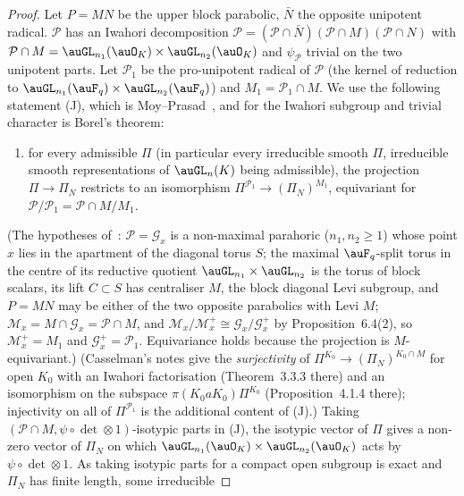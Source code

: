 \documentclass[10pt]{amsart}
\theoremstyle{definition}
\theoremstyle{remark}
\begin{document}
\begin{proof}
Let $P=MN$ be the upper block parabolic, $\bar N$ the opposite unipotent radical. $\mathcal P$ has
an Iwahori decomposition $\mathcal P=(\mathcal P\cap\bar N)(\mathcal P\cap M)(\mathcal P\cap N)$
with $\mathcal P\cap M=\auGL_{n_1}(\auO_K)\times\auGL_{n_2}(\auO_K)$ and $\psi_{\mathcal P}$ trivial on
the two unipotent parts. Let $\mathcal P_1$ be the pro-unipotent radical of $\mathcal P$ (the
kernel of reduction to $\auGL_{n_1}(\auF_q)\times\auGL_{n_2}(\auF_q)$) and $M_1=\mathcal P_1\cap M$.
We use the following statement (J), which is Moy--Prasad~\cite[Proposition~6.7, p.~116]{MoyPrasad}, and for
the Iwahori subgroup and trivial character is Borel's theorem:
\begin{enumerate}
\item[(J)] for every admissible $\Pi$ (in particular every irreducible smooth $\Pi$, irreducible smooth
representations of $\auGL_n(K)$ being admissible), the projection $\Pi\to\Pi_N$ restricts to an isomorphism
$\Pi^{\mathcal P_1}\to(\Pi_N)^{M_1}$, equivariant for $\mathcal P/\mathcal P_1=\mathcal P\cap M/M_1$.
\end{enumerate}
(The hypotheses of~\cite[6.3, Proposition~6.4, Proposition~6.7]{MoyPrasad}: $\mathcal P=\mathcal G_x$ is a
non-maximal parahoric ($n_1,n_2\ge1$) whose point $x$ lies in the apartment of the diagonal torus $S$; the
maximal $\auF_q$-split torus in the centre of its reductive quotient $\auGL_{n_1}\times\auGL_{n_2}$ is the
torus of block scalars, its lift $C\subset S$ has centraliser $M$, the block diagonal Levi subgroup, and
$P=MN$ may be either of the two opposite parabolics with Levi $M$; $\mathcal M_x=M\cap\mathcal G_x=
\mathcal P\cap M$, and $\mathcal M_x/\mathcal M_x^+\cong\mathcal G_x/\mathcal G_x^+$ by Proposition~6.4(2), so
$\mathcal M_x^+=M_1$ and $\mathcal G_x^+=\mathcal P_1$. Equivariance holds because the projection is
$M$-equivariant.)
(Casselman's notes \cite{CasselmanNotes} give the \emph{surjectivity} of $\Pi^{K_0}\to(\Pi_N)^{K_0\cap M}$
for open $K_0$ with an Iwahori factorisation (Theorem~3.3.3 there) and an isomorphism on the subspace
$\pi(K_0aK_0)\Pi^{K_0}$ (Proposition~4.1.4 there); injectivity on all of $\Pi^{\mathcal P_1}$ is the
additional content of (J).) Taking $(\mathcal P\cap M,\psi\circ\det\otimes1)$-isotypic parts in (J),
the isotypic vector of $\Pi$ gives a non-zero vector of $\Pi_N$ on which
$\auGL_{n_1}(\auO_K)\times\auGL_{n_2}(\auO_K)$ acts by $\psi\circ\det\otimes1$. As taking isotypic
parts for a compact open subgroup is exact and $\Pi_N$ has finite length, some irreducible

\end{proof}
\end{document}
